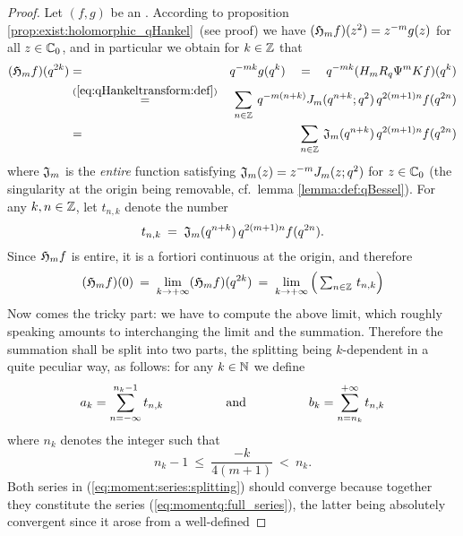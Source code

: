 \begin{proof}
Let $(f,g)$ be an \Hmpair\@. According to proposition
\ref{prop:exist:holomorphic_qHankel}\ (see proof)
we have $(\holH{m}f)(z^2) = z^{-m} g(z)$ for all $z\in \CC_0$, and in particular
we obtain for $k \in \ZZ$ that
\begin{eqnarray}
(\holH{m}f)(q^{2k}) &=& q^{-mk} g(q^k)
   \hspace{1em}=\hspace{1em}
      q^{-mk} (H_m R_q \Psi^m K f)(q^k)  \\
   &\stackrel{(\ref{eq:qHankeltransform:def})}{=}&
     \sum_{n\in \ZZ} \: q^{-m(n+k)} \J{m}{q^{n+k}}\, q^{2(m+1)n}  f(q^{2n}) \\
   &=&
     \sum_{n\in \ZZ} \: \varJ{m}(q^{n+k}) \, q^{2(m+1)n}  f(q^{2n})
     \label{eq:momentq:full_series}
\end{eqnarray}
where $\varJ{m}$ is the {\em entire\/} function satisfying
$\varJ{m}(z)= z^{-m} \J{m}{z}$ for $z\in \CC_0$
(the singularity at the origin being removable, cf.\ lemma \ref{lemma:def:qBessel}).
For any $k,n \in \ZZ$, let $t_{n,k}$ denote the number
$$ t_{n,k}  \:=\; \varJ{m}(q^{n+k}) \, q^{2(m+1)n}  f(q^{2n}). $$
Since $\holH{m}f$ is entire, it is a fortiori continuous at the origin,
and therefore
\begin{equation}\label{eq:moment:holHmf_at zero:limit:full_summ}
   (\holH{m}f)(0) \:=\; \lim_{k \rarr +\infty} (\holH{m}f)(q^{2k})
        \:=\; \lim_{k \rarr +\infty}
               \left(\vertL \textstyle \sum_{n\in \ZZ} \, t_{n,k}\right)
\end{equation}
Now comes the tricky part: we have to compute the above limit,
which roughly speaking amounts to interchanging the limit and the summation.
Therefore the summation shall be split into two parts, the splitting being
$k$-dependent in a quite peculiar way, as follows: for any $k\in\NN$ we define
\begin{equation}\label{eq:moment:series:splitting}
   a_k = \sum_{n=-\infty}^{n_k-1}   t_{n,k}
                      \andspace{5em}
   b_k = \sum_{n=n_k}^{+\infty}     t_{n,k}
\end{equation}
where $n_k$ denotes the integer such that
\begin{equation}\label{eq:moment:defn:smallest_int:nk}
  n_k -1   \:\leq\:  \frac{-k}{4(m+1)}   \: < \:  n_k.
\end{equation}
Both series in (\ref{eq:moment:series:splitting}) should converge because
together they constitute the series (\ref{eq:momentq:full_series}),
the latter being absolutely convergent since it arose from a well-defined

\end{proof}
